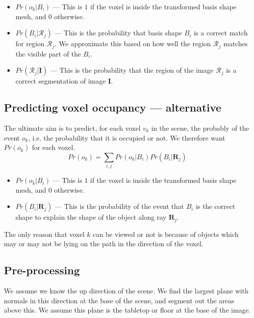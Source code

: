 \documentclass[10pt,a4paper, twocolumn]{article}
\makeatletter
\newcommand*{\ie}{i.e.\@\xspace}
\newcommand{\prob}{Pr}
\newcommand{\rgbdimage}{\mathbf{I}}
\newcommand{\imregion}{\mathcal{R}}
\newcommand{\occ}{o}
\newcommand{\basisshape}{B}
\newcommand{\ray}{\mathbf{R}}
\makeatother
\begin{document}
\begin{itemize}
\item $\prob(\occ_k|\basisshape_i)$ ---
This is $1$ if the voxel is inside the transformed basis shape mesh, and $0$ otherwise.
\item $\prob(\basisshape_i|\imregion_j)$ ---
This is the probability that basis shape $\basisshape_i$ is a correct match for region $\imregion_j$. 
We approximate this based on how well the region $\imregion_j$ matches the visible part of the $\basisshape_i$.
\item $\prob(\imregion_j|\rgbdimage)$ ---
This is the probability that the region of the image $\imregion_j$ is a correct segmentation of image $\rgbdimage$.
\end{itemize}

\subsection{Predicting voxel occupancy --- alternative}
The ultimate aim is to predict, for each voxel $v_k$ in the scene, the probably of the event $\occ_k$, \ie the probability that it is occupied or not. 
We therefore want $\prob(\occ_k)$ for each voxel.
$$
\prob(\occ_k ) = \sum_{i,j} \prob(\occ_k|\basisshape_i)\prob(\basisshape_i|\ray_j)
$$

\begin{itemize}
\item $\prob(\occ_k|\basisshape_i)$ ---
This is $1$ if the voxel is inside the transformed basis shape mesh, and $0$ otherwise.
\item $\prob(\basisshape_i|\ray_j)$ ---
This is the probability of the event that $\basisshape_i$ is the correct shape to explain the shape of the object along ray $\ray_j$.
\end{itemize}

The only reason that voxel $k$ can be viewed or not is because of objects which may or may not be lying on the path in the direction of the voxel.


\subsection{Pre-processing}
We assume we know the up direction of the scene.
We find the largest plane with normals in this direction at the base of the scene, and segment out the areas above this.
We assume this plane is the tabletop or floor at the base of the image.
\end{document}
